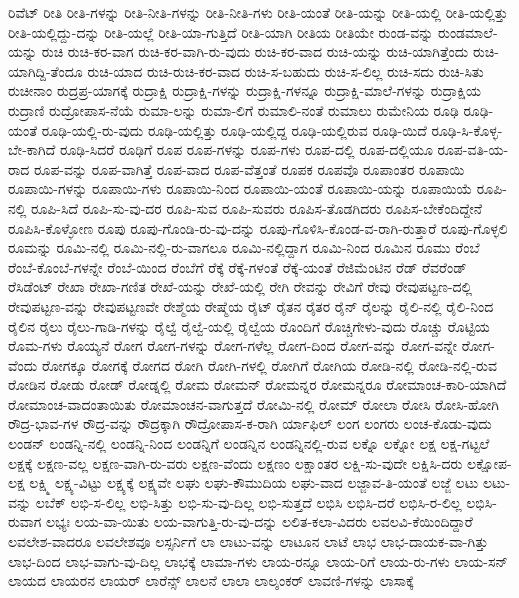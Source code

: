 {ರಿವೆಟ್
ರೀತಿ
ರೀತಿ-ಗಳನ್ನು
ರೀತಿ-ನೀತಿ-ಗಳನ್ನು
ರೀತಿ-ನೀತಿ-ಗಳು
ರೀತಿ-ಯಂತೆ
ರೀತಿ-ಯನ್ನು
ರೀತಿ-ಯಲ್ಲಿ
ರೀತಿ-ಯಲ್ಲಿತ್ತು
ರೀತಿ-ಯಲ್ಲಿದ್ದು-ದನ್ನು
ರೀತಿ-ಯಲ್ಲೆ
ರೀತಿ-ಯಾ-ಗುತ್ತಿದೆ
ರೀತಿ-ಯಾಗಿ
ರೀತಿಯ
ರೀತಿಯೇ
ರುಂಡ-ವನ್ನು
ರುಂಡಮಾಲೆ-ಯನ್ನು
ರುಚಿ
ರುಚಿ-ಕರ-ವಾಗ
ರುಚಿ-ಕರ-ವಾಗಿ-ರು-ವುದು
ರುಚಿ-ಕರ-ವಾದ
ರುಚಿ-ಯನ್ನು
ರುಚಿ-ಯಾಗಿತ್ತೆಂದು
ರುಚಿ-ಯಾಗಿದ್ದಿ-ತೆಂದೂ
ರುಚಿ-ಯಾದ
ರುಚಿ-ರುಚಿ-ಕರ-ವಾದ
ರುಚಿ-ಸ-ಬಹುದು
ರುಚಿ-ಸ-ಲಿಲ್ಲ
ರುಚಿ-ಸದು
ರುಚಿ-ಸಿತು
ರುಚೀನಾಂ
ರುದ್ರಪ್ರ-ಯಾಗಕ್ಕೆ
ರುದ್ರಾಕ್ಷಿ
ರುದ್ರಾಕ್ಷಿ-ಗಳನ್ನು
ರುದ್ರಾಕ್ಷಿ-ಗಳನ್ನೂ
ರುದ್ರಾಕ್ಷಿ-ಮಾಲೆ-ಗಳನ್ನು
ರುದ್ರಾಕ್ಷಿಯ
ರುದ್ರಾಣಿ
ರುದ್ರೋಪಾಸ-ನೆಯೆ
ರುಮಾ-ಲನ್ನು
ರುಮಾ-ಲಿಗೆ
ರುಮಾಲಿ-ನಂತೆ
ರುಮಾಲು
ರುಮೇನಿಯ
ರೂಢಿ
ರೂಢಿ-ಯಂತೆ
ರೂಢಿ-ಯಲ್ಲಿ-ರು-ವುದು
ರೂಢಿ-ಯಲ್ಲಿತ್ತು
ರೂಢಿ-ಯಲ್ಲಿದ್ದ
ರೂಢಿ-ಯಲ್ಲಿರುವ
ರೂಢಿ-ಯಿದೆ
ರೂಢಿ-ಸಿ-ಕೊಳ್ಳ-ಬೇ-ಕಾಗಿದೆ
ರೂಢಿ-ಸಿದರೆ
ರೂಢಿಗೆ
ರೂಪ
ರೂಪ-ಗಳನ್ನು
ರೂಪ-ಗಳು
ರೂಪ-ದಲ್ಲಿ
ರೂಪ-ದಲ್ಲಿಯೂ
ರೂಪ-ವತಿ-ಯ-ರಾದ
ರೂಪ-ವನ್ನು
ರೂಪ-ವಾಗಿತ್ತೆ
ರೂಪ-ವಾದ
ರೂಪ-ವೆತ್ತಂತೆ
ರೂಪಕ
ರೂಪವೊ
ರೂಪಾಂತರ
ರೂಪಾಯಿ
ರೂಪಾಯಿ-ಗಳನ್ನು
ರೂಪಾಯಿ-ಗಳು
ರೂಪಾಯಿ-ನಿಂದ
ರೂಪಾಯಿ-ಯಂತೆ
ರೂಪಾಯಿ-ಯನ್ನು
ರೂಪಾಯಿಯೆ
ರೂಪಿ-ನಲ್ಲಿ
ರೂಪಿ-ಸಿದೆ
ರೂಪಿ-ಸು-ವು-ದರ
ರೂಪಿ-ಸುವ
ರೂಪಿ-ಸುವರು
ರೂಪಿಸ-ತೊಡಗಿದರು
ರೂಪಿಸ-ಬೇಕೆಂದಿದ್ದೇನೆ
ರೂಪಿಸಿ-ಕೊಳ್ಳೋಣ
ರೂಪು
ರೂಪು-ಗೊಂಡಿ-ರು-ವು-ದನ್ನು
ರೂಪು-ಗೊಳಿಸಿ-ಕೊಂಡ-ವ-ರಾಗಿ-ರುತ್ತಾರೆ
ರೂಪು-ಗೊಳ್ಳಲಿ
ರೂಮನ್ನು
ರೂಮಿ-ನಲ್ಲಿ
ರೂಮಿ-ನಲ್ಲಿ-ರು-ವಾಗಲೂ
ರೂಮಿ-ನಲ್ಲಿದ್ದಾಗ
ರೂಮಿ-ನಿಂದ
ರೂಮಿನ
ರೂಮು
ರೆಂಬೆ
ರೆಂಬೆ-ಕೊಂಬೆ-ಗಳನ್ನೇ
ರೆಂಬೆ-ಯಿಂದ
ರೆಂಬೆಗೆ
ರೆಕ್ಕೆ
ರೆಕ್ಕೆ-ಗಳಂತೆ
ರೆಕ್ಕೆ-ಯಂತೆ
ರೆಜಿಮೆಂಟಿನ
ರೆಡ್
ರೆವರೆಂಡ್
ರೆಸಿಡೆಂಟ್
ರೇಖಾ
ರೇಖಾ-ಗಣಿತ
ರೇಖೆ-ಯನ್ನು
ರೇಖೆ-ಯಲ್ಲಿ
ರೇಗಿ
ರೇವನ್ನು
ರೇವಿಗೆ
ರೇವು
ರೇವುಪಟ್ಟಣ-ದಲ್ಲಿ
ರೇವುಪಟ್ಟಣ-ವನ್ನು
ರೇವುಪಟ್ಟಣವೇ
ರೇಶ್ಮೆಯ
ರೇಷ್ಮೆಯ
ರೈಟ್
ರೈತನ
ರೈತರ
ರೈನ್
ರೈಲನ್ನು
ರೈಲಿ-ನಲ್ಲಿ
ರೈಲಿ-ನಿಂದ
ರೈಲಿನ
ರೈಲು
ರೈಲು-ಗಾಡಿ-ಗಳನ್ನು
ರೈಲ್ವೆ
ರೈಲ್ವೆ-ಯಲ್ಲಿ
ರೈಲ್ವೆಯ
ರೊಂದಿಗೆ
ರೊಚ್ಚಿಗೇಳು-ವುದು
ರೊಚ್ಚು
ರೊಟ್ಟಿಯ
ರೊಮ-ಗಳು
ರೊಯ್ಯನೆ
ರೋಗ
ರೋಗ-ಗಳನ್ನು
ರೋಗ-ಗಳೆಲ್ಲ
ರೋಗ-ದಿಂದ
ರೋಗ-ವನ್ನು
ರೋಗ-ವನ್ನೇ
ರೋಗ-ವೆಂದು
ರೋಗಕ್ಕೂ
ರೋಗಕ್ಕೆ
ರೋಗದ
ರೋಗಿ
ರೋಗಿ-ಗಳಲ್ಲಿ
ರೋಗಿಗೆ
ರೋಗಿಯ
ರೋಡಿ-ನಲ್ಲಿ
ರೋಡಿ-ನಲ್ಲಿ-ರುವ
ರೋಡಿನ
ರೋಡು
ರೋಡ್
ರೋಡ್ನಲ್ಲಿ
ರೋಮ
ರೋಮನ್
ರೋಮನ್ನರ
ರೋಮನ್ನರೂ
ರೋಮಾಂಚ-ಕಾರಿ-ಯಾಗಿದೆ
ರೋಮಾಂಚ-ವಾದಂತಾಯಿತು
ರೋಮಾಂಚನ-ವಾಗುತ್ತದೆ
ರೋಮಿ-ನಲ್ಲಿ
ರೋಮ್
ರೋಲಾ
ರೋಸಿ
ರೋಸಿ-ಹೋಗಿ
ರೌದ್ರ-ಭಾವ-ಗಳ
ರೌದ್ರ-ವನ್ನು
ರೌದ್ರಕ್ಕಾಗಿ
ರೌದ್ರೋಪಾಸ-ಕ-ರಾಗಿ
ರ್ಯಾಫಿಲ್
ಲಂಗ
ಲಂಗರು
ಲಂಚ-ಕೊಡು-ವುದು
ಲಂಡನ್
ಲಂಡನ್ನಿ-ನಲ್ಲಿ
ಲಂಡನ್ನಿ-ನಿಂದ
ಲಂಡನ್ನಿಗೆ
ಲಂಡನ್ನಿನ
ಲಂಡನ್ನಿನಲ್ಲಿ-ರುವ
ಲಕ್ನೊ
ಲಕ್ನೋ
ಲಕ್ಷ
ಲಕ್ಷ-ಗಟ್ಟಲೆ
ಲಕ್ಷಕ್ಕೆ
ಲಕ್ಷಣ-ವಲ್ಲ
ಲಕ್ಷಣ-ವಾಗಿ-ರು-ವರು
ಲಕ್ಷಣ-ವೆಂದು
ಲಕ್ಷಣಂ
ಲಕ್ಷಾಂತರ
ಲಕ್ಷಿ-ಸು-ವುದೇ
ಲಕ್ಷಿಸಿ-ದರು
ಲಕ್ಷೋಪ-ಲಕ್ಷ
ಲಕ್ಷ್ಮಿ
ಲಕ್ಷ್ಯ-ವಿಟ್ಟು
ಲಕ್ಷ್ಯಕ್ಕೆ
ಲಕ್ಷ್ಯವೇ
ಲಘು
ಲಘು-ಕೌಮುದಿಯ
ಲಘು-ವಾದ
ಲಜ್ಜಾವ-ತಿ-ಯಂತೆ
ಲಜ್ಜೆ
ಲಟು
ಲಟು-ವನ್ನು
ಲಬೆಕ್
ಲಭಿ-ಸ-ಲಿಲ್ಲ
ಲಭಿ-ಸಿತ್ತು
ಲಭಿ-ಸು-ವು-ದಿಲ್ಲ
ಲಭಿ-ಸುತ್ತದೆ
ಲಭಿಸಿ
ಲಭಿಸಿ-ದರೆ
ಲಭಿಸಿ-ರ-ಲಿಲ್ಲ
ಲಭಿಸಿ-ರುವಾಗ
ಲಭ್ಯಃ
ಲಯ-ವಾ-ಯಿತು
ಲಯ-ವಾಗುತ್ತಿ-ರು-ವು-ದನ್ನು
ಲಲಿತ-ಕಲಾ-ವಿದರು
ಲವಲವಿ-ಕೆಯಿಂದಿದ್ದಾರೆ
ಲವಲೇಶ-ವಾದರೂ
ಲವಲೇಶವೂ
ಲಸ್ಸರ್ನಿಗೆ
ಲಾ
ಲಾಟು-ವನ್ನು
ಲಾಟೂನ
ಲಾಟೆ
ಲಾಭ
ಲಾಭ-ದಾಯಕ-ವಾ-ಗಿತ್ತು
ಲಾಭ-ದಿಂದ
ಲಾಭ-ವಾಗು-ವು-ದಿಲ್ಲ
ಲಾಭಕ್ಕೆ
ಲಾಮಾ-ಗಳು
ಲಾಯ-ರನ್ನೂ
ಲಾಯ-ರಿಗೆ
ಲಾಯ-ರು-ಗಳು
ಲಾಯ-ಸನ್
ಲಾಯದ
ಲಾಯರನ
ಲಾಯರ್
ಲಾರೆನ್ಸ್
ಲಾಲನೆ
ಲಾಲಾ
ಲಾಲ್ಶಂಕರ್
ಲಾವಣಿ-ಗಳನ್ನು
ಲಾಸಾಕ್ಕೆ
}
